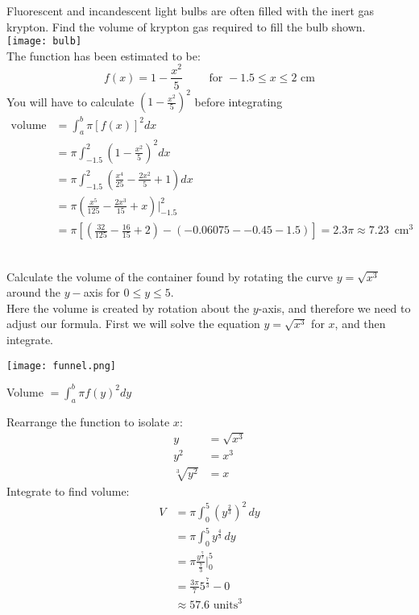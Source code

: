 \example Fluorescent and incandescent light bulbs are often filled with the inert gas krypton. Find the volume of krypton gas required to fill the bulb shown.\vspace{0.4cm}\\ 
\texttt{[image: bulb]}\\
The function has been estimated to be:\\
\[f(x)=1-\frac{x^2}{5}\qquad\text{ for } -1.5\leq x \leq 2\text{ cm}\] 
\solution You will have to calculate $\left(1-\frac{x^2}{5}\right)^2$ before integrating\\
	\begin{align*}
	\text{volume}&=\int_{a}^{b}\pi[f(x)]^2 dx\\
	&=\pi\int_{-1.5}^{2}\left(1-\frac{x^2}{5}\right)^2 dx\\
	&=\pi\int_{-1.5}^{2}\left(\frac{x^4}{25}-\frac{2x^2}{5}+1\right)dx\\
	&=\pi\left(\frac{x^5}{125}-\frac{2x^3}{15}+x\right)  \Bigg|_{-1.5}^2\\
	&=\pi\left[\left(\frac{32}{125}-\frac{16}{15}+2\right)-\left(-0.06075--0.45-1.5\right)\right]=2.3\pi\approx 7.23\, \text{ cm}^3\end{align*}
\\	
\begin{multicols}{2}
\examq Calculate the volume of the container found by rotating the curve $y=\sqrt{x^3}$ around the $y-$axis for $0\leq y \leq 5$.\\

Here the volume is created by rotation about the $y$-axis, and therefore we need to adjust our formula. First we will solve the equation $y=\sqrt{x^3}$ for $x$, and then integrate.
\columnbreak
\begin{center}
		\texttt{[image: funnel.png]}
\end{center}
\end{multicols}

\solution Volume $=\int_{a}^{b} \pi f(y)^2 dy$\\
\begin{multicols}{2}
Rearrange the function to isolate $x$:
	\begin{align*}
	y&=\sqrt{x^3}\\
	y^2&=x^3\\
	\sqrt[3]{y^2}&=x\end{align*}
Integrate to find volume:\\
	\begin{align*}V&=\pi\int_{0}^{5} (y^{\frac{2}{3}})^2\,dy\\
	&=\pi\int_{0}^{5} y^{\frac{4}{3}}\,dy\\
	&=\pi\frac{y^{\frac{7}{3}}}{\frac{7}{3}}\bigg\vert_{0}^{5}\\
	&=\frac{3\pi}{7}5^{\frac{7}{3}}-0\\
	&\approx 57.6 \,\,\mathrm{units}^3
	\end{align*}
\end{multicols}

